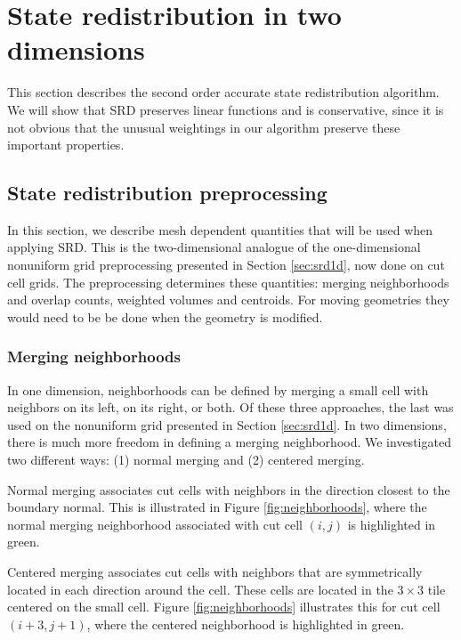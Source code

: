 \section{State redistribution in two dimensions}\label{sec:srdAlg}

This section describes the second order accurate
state redistribution algorithm. 
We will show that SRD preserves linear functions and is conservative, since
it is not obvious that the unusual weightings in our algorithm
preserve these important properties.

\subsection{State redistribution preprocessing}\label{sec:preprocessing}


In this section, we describe mesh dependent quantities that will be used when applying 
SRD. This is the two-dimensional analogue of the one-dimensional 
nonuniform grid preprocessing presented in Section \ref{sec:srd1d}, now done on cut cell grids.
The preprocessing determines these quantities: merging neighborhoods and overlap counts, 
weighted volumes and centroids.
For moving geometries they would need to be be done when the geometry is modified.

\subsubsection*{Merging neighborhoods}

In one dimension, neighborhoods can be defined by merging a small cell with neighbors on its left, on its right, or both.  Of these three approaches, the last was used on the nonuniform grid presented in Section \ref{sec:srd1d}.
In two dimensions, there is much more freedom in defining a merging neighborhood.  
We investigated two different ways: (1) normal merging and (2) centered merging.

Normal merging associates cut cells with neighbors in the direction closest to the 
boundary normal.  This is illustrated in Figure \ref{fig:neighborhoods},
where the normal merging neighborhood associated with cut cell $(i,j)$ is highlighted in green.

Centered merging associates cut cells with neighbors that are 
symmetrically located in each direction around the cell.
These cells are located in the $3 \times 3$ tile centered on the small cell.  Figure \ref{fig:neighborhoods}
illustrates this for cut cell $(i+3,j+1)$, where the centered neighborhood is highlighted in green.

